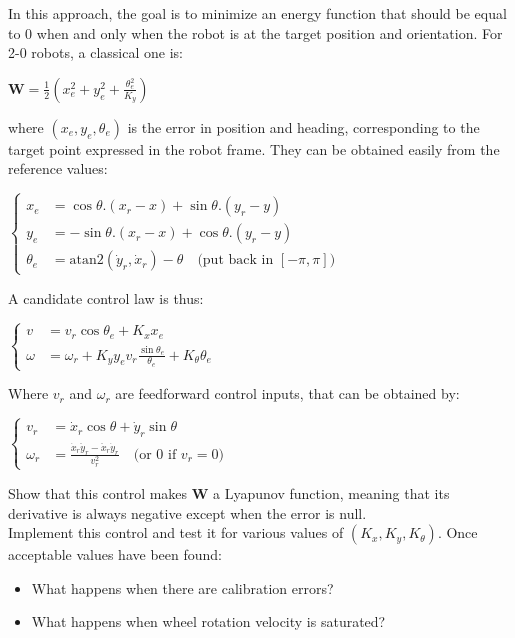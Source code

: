 \documentclass{ecnreport}
\begin{document}
In this approach, the goal is to minimize an energy function that should be equal to 0 when and only when the robot is at the target position and orientation. For 2-0 robots, a classical one is:
\def\W{\mathbf{W}}
\begin{center}
 $\W = \displaystyle \frac{1}{2}\left(x_e^2 + y_e^2 + \frac{\theta_e^2}{K_y}\right)$
\end{center}
where $(x_e, y_e, \theta_e)$ is the error in position and heading, corresponding to the target point expressed in the robot frame. They can be obtained easily from the reference values:
\begin{center}
 $\left\{\begin{array}{ll}
  x_e &= \cos\theta.(x_r-x) + \sin\theta.(y_r-y) \\
  y_e &= -\sin\theta.(x_r-x) + \cos\theta.(y_r-y) \\
  \theta_e &= \text{atan2}(\dot y_r, \dot x_r) - \theta \quad  \text{(put back in } [-\pi, \pi]\text{)}
\end{array}\right.$
\end{center}
A candidate control law is thus:
\begin{center}
 $\left\{\begin{array}{ll}
          v &= v_r\cos\theta_e + K_x x_e \\
          \omega &= \displaystyle\omega_r + K_y y_e v_r \frac{\sin\theta_e}{\theta_e} + K_\theta \theta_e
         \end{array}\right.$
\end{center}
Where $v_r$ and $\omega_r$ are feedforward control inputs, that can be obtained by:
\begin{center}
 $\left\{\begin{array}{ll} 
          v_r &= \dot x_r\cos\theta + \dot y_r \sin\theta \\
          \omega_r &= \displaystyle\frac{\dot x_r \ddot y_r - \ddot x_r \dot y_r}{v_r^2}\quad  \text{(or 0 if } v_r = 0\text{)}
         \end{array}\right.$
\end{center}
Show that this control makes $\W$ a Lyapunov function, meaning that its derivative is always negative except when the error is null.\\

Implement this control and test it for various values of $(K_x, K_y, K_\theta)$. Once acceptable values have been found:
\begin{itemize}
 \item What happens when there are calibration errors?
 \item What happens when wheel rotation velocity is saturated?
\end{itemize} 
\end{document}
